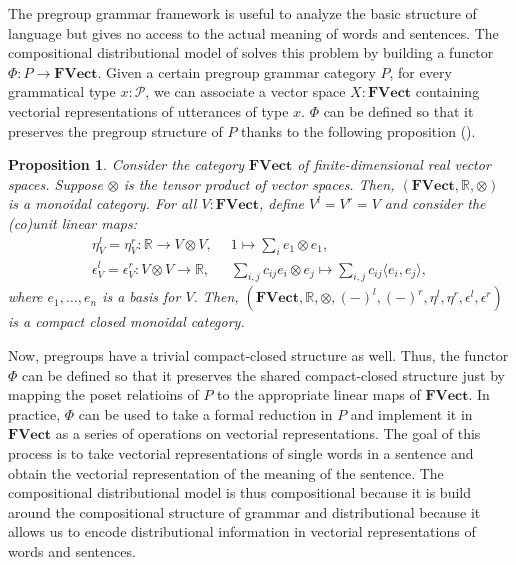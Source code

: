 \documentclass[11pt,a4paper,openright,twoside]{report}
\newcounter{mycounter}
\theoremstyle{plain}
\newtheorem{proposition}[mycounter]{Proposition}
\theoremstyle{definition}
\begin{document}
The pregroup grammar framework is useful to analyze the basic structure of language but gives no access to the actual meaning of words and sentences. The compositional distributional model of \cite{coecke2010mathematical} solves this problem by building a functor $\Phi: P \to  \mathbf{FVect}$. Given a certain pregroup grammar category $P$, for every grammatical type $x: \mathcal{P}$, we can associate a vector space $X:\mathbf{FVect}$ containing vectorial representations of utterances of type $x$. $\Phi$ can be defined so that it preserves the pregroup structure of $P$ thanks to the following proposition (\cite{coecke2010mathematical}).

\begin{proposition}
  Consider the category $\mathbf{FVect}$ of finite-dimensional real vector spaces. Suppose $\otimes$ is the tensor product of vector spaces. Then, $(\mathbf{FVect}, \mathbb{R}, \otimes)$ is a monoidal category.  
  For all $V: \mathbf{FVect}$, define $V^l = V^r = V$ and consider the (co)unit linear maps:
  \begin{align*}
    \eta_V^l = \eta_V^r: \mathbb{R} \to V \otimes V, \,\,\, &1 \mapsto \sum_i e_1 \otimes e_1,\\
    \epsilon_V^l = \epsilon_V^r: V \otimes V \to \mathbb{R}, \,\,\, &\sum_{i,j} c_{ij} e_i \otimes e_j \mapsto \sum_{i,j} c_{ij} \langle e_i, e_j \rangle,
  \end{align*}
  where $e_1, \dots, e_n$ is a basis for $V$. Then, $(\mathbf{FVect}, \mathbb{R}, \otimes, (-)^l, (-)^r, \eta^l, \eta^r, \epsilon^l, \epsilon^r)$ is a compact closed monoidal category.
\end{proposition}

Now, pregroups have a trivial compact-closed structure as well. Thus, the functor $\Phi$ can be defined so that it preserves the shared compact-closed structure just by mapping the poset relatioins of $P$ to the appropriate linear maps of $\mathbf{FVect}$. In practice, $\Phi$ can be used to take a formal reduction in $P$ and implement it in $\mathbf{FVect}$ as a series of operations on vectorial representations. The goal of this process is to take vectorial representations of single words in a sentence and obtain the vectorial representation of the meaning of the sentence. The compositional distributional model is thus compositional because it is build around the compositional structure of grammar and distributional because it allows us to encode distributional information in vectorial representations of words and sentences.
\end{document}

